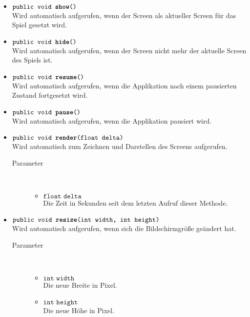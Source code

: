\begin{description}
\begin{itemize}
		\item $\texttt{public void \textbf{show}()}$ \\ Wird automatisch aufgerufen, wenn der Screen als aktueller Screen für das Spiel gesetzt wird.
	
		\item $\texttt{public void \textbf{hide}()}$ \\ Wird automatisch aufgerufen, wenn der Screen nicht mehr der aktuelle Screen des Spiels ist.
	
		\item $\texttt{public void \textbf{resume}()}$ \\ Wird automatisch aufgerufen, wenn die Applikation nach einem pausierten Zustand fortgesetzt wird.	
	
		\item $\texttt{public void \textbf{pause}()}$ \\ Wird automatisch aufgerufen, wenn die Applikation pausiert wird.
	
		\item $\texttt{public void \textbf{render}(float delta)}$ \\ Wird automatisch zum Zeichnen und Darstellen des Screens aufgerufen.
		\begin{description}
			\item[Parameter] \hfill \\
			\vspace{-.8cm}
			\begin{itemize}
				\item $\texttt{float delta}$ \\ Die Zeit in Sekunden seit dem letzten Aufruf dieser Methode.
			\end{itemize}
		\end{description}	
	
		\item $\texttt{public void \textbf{resize}(int width, int height)}$ \\ Wird automatisch aufgerufen, wenn sich die Bildschirmgröße geändert hat.
		\begin{description}
			\item[Parameter] \hfill \\
			\vspace{-.8cm}
			\begin{itemize}
				\item $\texttt{int width}$ \\ Die neue Breite in Pixel.
				\item $\texttt{int height}$ \\ Die neue Höhe in Pixel.
			\end{itemize}
		\end{description}
	\end{itemize}
\end{description}

